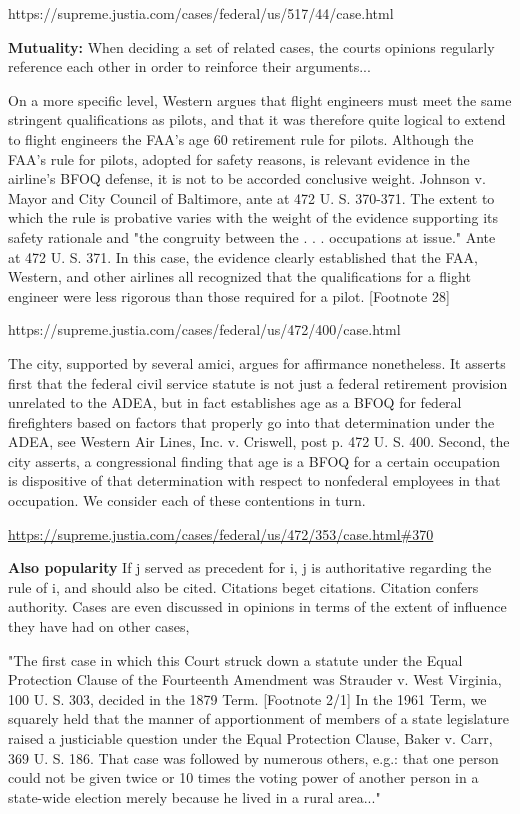 \documentclass[headsepline=true, abstracton]{scrartcl}
\begin{document}
https://supreme.justia.com/cases/federal/us/517/44/case.html


\textbf{Mutuality:} When deciding a set of related cases, the courts opinions regularly reference each other in order to reinforce their arguments...

On a more specific level, Western argues that flight engineers must meet the same stringent qualifications as pilots, and that it was therefore quite logical to extend to flight engineers the FAA's age 60 retirement rule for pilots. Although the FAA's rule for pilots, adopted for safety reasons, is relevant evidence in the airline's BFOQ defense, it is not to be accorded conclusive weight. Johnson v. Mayor and City Council of Baltimore, ante at 472 U. S. 370-371. The extent to which the rule is probative varies with the weight of the evidence supporting its safety rationale and "the congruity between the . . . occupations at issue." Ante at 472 U. S. 371. In this case, the evidence clearly established that the FAA, Western, and other airlines all recognized that the qualifications for a flight engineer were less rigorous than those required for a pilot. [Footnote 28]

https://supreme.justia.com/cases/federal/us/472/400/case.html

The city, supported by several amici, argues for affirmance nonetheless. It asserts first that the federal civil service statute is not just a federal retirement provision unrelated to the ADEA, but in fact establishes age as a BFOQ for federal firefighters based on factors that properly go into that determination under the ADEA, see Western Air Lines, Inc. v. Criswell, post p. 472 U. S. 400. Second, the city asserts, a congressional finding that age is a BFOQ for a certain occupation is dispositive of that determination with respect to nonfederal employees in that occupation. We consider each of these contentions in turn.

\url{https://supreme.justia.com/cases/federal/us/472/353/case.html#370}

\textbf{Also popularity} If j served as precedent for i, j is authoritative regarding the rule of i, and should also be cited. Citations beget citations. Citation confers authority. Cases are even discussed in opinions in terms of the extent of influence they have had on other cases,

"The first case in which this Court struck down a statute under the Equal Protection Clause of the Fourteenth Amendment was Strauder v. West Virginia, 100 U. S. 303, decided in the 1879 Term. [Footnote 2/1] In the 1961 Term, we squarely held that the manner of apportionment of members of a state legislature raised a justiciable question under the Equal Protection Clause, Baker v. Carr, 369 U. S. 186. That case was followed by numerous others, e.g.: that one person could not be given twice or 10 times the voting power of another person in a state-wide election merely because he lived in a rural area..."
\end{document}
